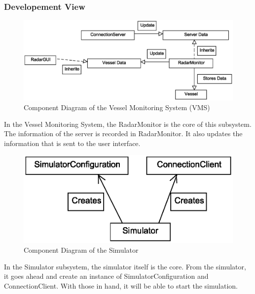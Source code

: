 \documentclass{article}
\begin{document}
\subsubsection{Developement View} %
\begin{figure}[!htb]
\caption{Component Diagram of the Vessel Monitoring System (VMS)}
\centering
\includegraphics[scale=0.4]{diagrams/vms-component-diagram.eps}
\end{figure}
In the Vessel Monitoring System, the RadarMonitor is the core of this subsystem.
The information of the server is recorded in RadarMonitor.
It also updates the information that is sent to the user interface.

\begin{figure}[!htb]
\caption{Component Diagram of the Simulator}
\centering
\includegraphics[scale=0.4]{diagrams/simulator-component-diagram.eps}
\end{figure}
In the Simulator subsystem, the simulator itself is the core.
From the simulator, it goes ahead and create an instance of SimulatorConfiguration and ConnectionClient.
With those in hand, it will be able to start the simulation.

\break
\end{document}
